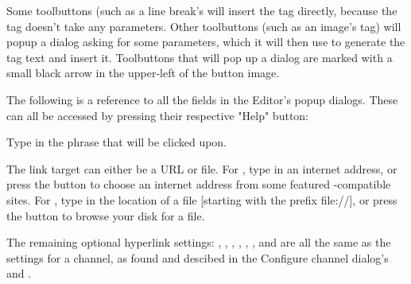 
Some toolbuttons (such as a line break's  will insert the tag 
directly, because the tag doesn't take any parameters. Other toolbuttons 
(such as an image's  tag) will popup a dialog asking for some 
parameters, which it will then use to generate the tag text and insert it. 
Toolbuttons that will pop up a dialog are marked with a small black arrow in 
the upper-left of the button image. 

The following is a reference to all the fields in the Editor's popup dialogs. 
These can all be accessed by pressing their respective "Help" button:


 Type in the phrase that will be clicked upon.  

The link target can either be a URL or file. For , 
type in an internet address, or press the  
button to choose an internet address from some featured \brandingapplicationsuitename-compatible 
sites. For , type in the location of a file
[starting with the prefix file://], or press the 
 button to browse your disk for a file.

The remaining optional hyperlink settings: 
, 
, 
, 
,
,
, and 
are all the same as the settings for a channel, as found and descibed in the 
Configure channel dialog's 
\helpignore{\ref{sec:pd-channel-dialog-spidering-tab}}
and 
\helpignore{\ref{sec:pd-channel-dialog-images-tab}}
.

